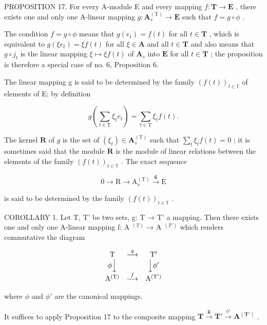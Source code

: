 PROPOSITION 17. For every A-module E and every mapping \(f: \mathbf{T} \to \mathbf{E}\) , there exists one and only one A-linear mapping \(g: \mathbf{A}_{s}^{(\mathrm{T})} \to \mathbf{E}\) such that \(f = g \circ \phi\) .

The condition \(f = g \circ \phi\) means that \(g(e_t) = f(t)\) for all \(t \in \mathbf{T}\) , which is equivalent to \(g(\xi e_t) = \xi f(t)\) for all \(\xi \in \mathbf{A}\) and all \(t \in \mathbf{T}\) and also means that \(g \circ j_t\) is the linear mapping \(\xi \mapsto \xi f(t)\) of \(\mathbf{A}_s\) into \(\mathbf{E}\) for all \(t \in \mathbf{T}\) ; the proposition is therefore a special case of no. 6, Proposition 6.

The linear mapping g is said to be determined by the family \((f(t))_{t\in\mathbb{T}}\) of elements of E; by definition

\[
g \left(\sum_ {t \in \mathrm{T}} \xi_ {t} e _ {t}\right) = \sum_ {t \in \mathrm{T}} \xi_ {t} f (t).\tag{43}
\]

The kernel \(\mathbf{R}\) of \(g\) is the set of \((\xi_t) \in \mathbf{A}_s^{(\mathrm{T})}\) such that \(\sum_{t} \xi_t f(t) = 0\) ; it is sometimes said that the module \(\mathbf{R}\) is the module of linear relations between the elements of the family \((f(t))_{t \in \mathbb{T}}\) . The exact sequence

\[
0 \longrightarrow \mathrm{R} \longrightarrow \mathrm{A} _ {s} ^ {(\mathrm{T})} \stackrel {\mathbf {g}} {\longrightarrow} \mathrm{E}\tag{44}
\]

is said to be determined by the family \((f(t))_{t\in\mathbb{T}}\) .

COROLLARY 1. Let T, T' be two sets, g: T → T' a mapping. Then there exists one and only one A-linear mapping f: A \(^{(T)}\) → A \(^{(T')}\) which renders commutative the diagram

\[
\begin{array}{c c c} \mathrm{T} & \stackrel {{g}} {{\longrightarrow}} & \mathrm{T} ^ {\prime} \\ \phi \Big \downarrow & & \Big \downarrow \phi^ {\prime} \\ \mathrm{A} ^ {(\mathrm{T})} & \stackrel {{f}} {{\longrightarrow}} & \mathrm{A} ^ {(\mathrm{T} ^ {\prime})} \end{array}
\]

where \(\phi\) and \(\phi'\) are the canonical mappings.

It suffices to apply Proposition 17 to the composite mapping \(\mathbf{T} \xrightarrow{\pmb{g}} \mathbf{T}' \xrightarrow{\phi'} \mathbf{A}^{(\mathbf{T}')}\) .

